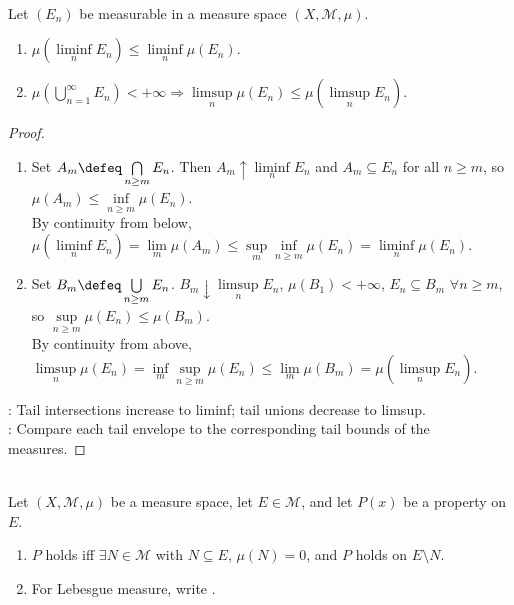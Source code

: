 \begin{proposition} \label{prop:measure-liminf-limsup-inequalities} \\
Let $(E_n)$ be measurable in a measure space $(X,\mathcal{M},\mu)$.
\begin{enumerate}[label=(\roman*)]
\setlength{\itemsep}{0pt}
\item $\mu(\liminf\limits_nE_n)\leq\liminf\limits_n\mu(E_n)$.
\item $\mu(\bigcup\limits_{n=1}^{\infty}E_n)<+\infty\Longrightarrow\limsup\limits_n\mu(E_n)\leq\mu(\limsup\limits_nE_n)$.
\end{enumerate}
\begin{proof}
\begin{enumerate}[label=(\roman*)]
\setlength{\itemsep}{0pt}
\item Set $A_m\defeq\bigcap\limits_{n\geq m}E_n$. Then $A_m\uparrow\liminf\limits_nE_n$ and $A_m\subseteq E_n$ for all $n\geq m$, so $\mu(A_m)\leq\inf\limits_{n\geq m}\mu(E_n)$.\\
By continuity from below, $\mu(\liminf\limits_nE_n)=\lim\limits_m\mu(A_m)\leq\sup\limits_m\inf\limits_{n\geq m}\mu(E_n)=\liminf\limits_n\mu(E_n)$.
\item Set $B_m\defeq\bigcup\limits_{n\geq m}E_n$. $B_m\downarrow\limsup\limits_nE_n$, $\mu(B_1)<+\infty$, $E_n\subseteq B_m$ $\forall n\geq m$, so $\sup\limits_{n\geq m}\mu(E_n)\leq\mu(B_m)$.\\
By continuity from above, $\limsup\limits_n\mu(E_n)=\inf\limits_m\sup\limits_{n\geq m}\mu(E_n)\leq\lim\limits_m\mu(B_m)=\mu(\limsup\limits_nE_n)$.
\end{enumerate}
: Tail intersections increase to liminf; tail unions decrease to limsup.\\
: Compare each tail envelope to the corresponding tail bounds of the measures.
\end{proof}
\end{proposition}

\begin{definition} \label{def:almost-everywhere-set-property} \\
Let $(X,\mathcal{M},\mu)$ be a measure space, let $E\in\mathcal{M}$, and let $P(x)$ be a property on $E$.
\begin{enumerate}[label=(\roman*)]
\setlength{\itemsep}{0pt}
\item $P$ holds  iff $\exists N\in\mathcal{M}$ with $N\subseteq E$, $\mu(N)=0$, and $P$ holds on $E\setminus N$.
\item For Lebesgue measure, write .
\end{enumerate}
\end{definition}

